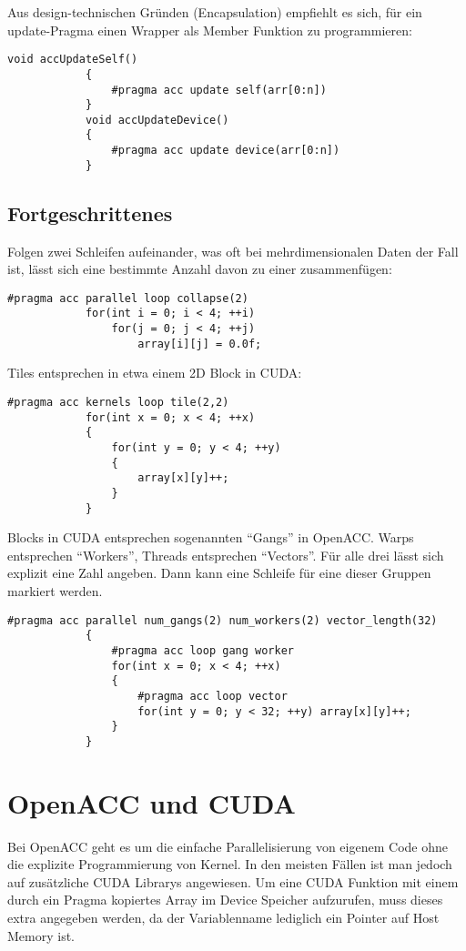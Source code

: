 			Aus design-technischen Gründen (Encapsulation) empfiehlt es sich, für ein update-Pragma einen Wrapper als Member Funktion zu programmieren:
			
			\begin{lstlisting}[caption=OpenACC: Update Member-Funktion]
			void accUpdateSelf() 
			{
				#pragma acc update self(arr[0:n])
			}
			void accUpdateDevice() 
			{
				#pragma acc update device(arr[0:n])
			}			
			\end{lstlisting}

			\newpage
			\subsection{Fortgeschrittenes}
			Folgen zwei Schleifen aufeinander, was oft bei mehrdimensionalen Daten der Fall ist, lässt sich eine bestimmte Anzahl davon zu einer zusammenfügen:
			
			\begin{lstlisting}[caption=OpenACC: Loop Collapse]
			#pragma acc parallel loop collapse(2)
			for(int i = 0; i < 4; ++i) 
				for(j = 0; j < 4; ++j)
					array[i][j] = 0.0f;
			\end{lstlisting}
			
			Tiles entsprechen in etwa einem 2D \Gls{Block} in CUDA:
			
			\begin{lstlisting}[caption=OpenACC: Tile]
			#pragma acc kernels loop tile(2,2)
			for(int x = 0; x < 4; ++x)
			{
				for(int y = 0; y < 4; ++y)
				{
					array[x][y]++;
				}
			}
			\end{lstlisting}
			
			\Glspl{Block} in CUDA entsprechen sogenannten \enquote{\Glspl{Gang}} in OpenACC. \Glspl{Warp} entsprechen \enquote{\Glspl{Worker}}, \Glspl{Thread} entsprechen \enquote{\Glspl{Vector}}. Für alle drei lässt sich explizit eine Zahl angeben. Dann kann eine Schleife für eine dieser Gruppen markiert werden.
			
			\begin{lstlisting}[caption=OpenACC: Gangs Workers Vectors]
			#pragma acc parallel num_gangs(2) num_workers(2) vector_length(32)
			{
				#pragma acc loop gang worker
				for(int x = 0; x < 4; ++x)
				{
					#pragma acc loop vector
					for(int y = 0; y < 32; ++y) array[x][y]++;
				}
			}			
			\end{lstlisting}
			
		\section{OpenACC und CUDA}
		Bei OpenACC geht es um die einfache Parallelisierung von eigenem Code ohne die explizite Programmierung von \Gls{Kernel}. In den meisten Fällen ist man jedoch auf zusätzliche CUDA Librarys angewiesen. Um eine CUDA Funktion mit einem durch ein Pragma kopiertes Array im Device Speicher aufzurufen, muss dieses extra angegeben werden, da der Variablenname lediglich ein Pointer auf Host Memory ist.
		
